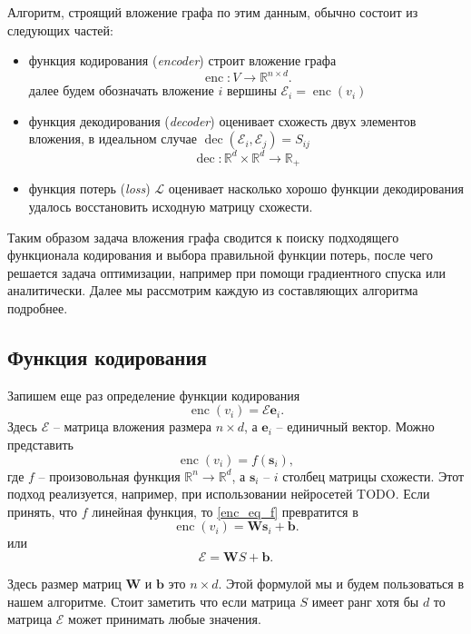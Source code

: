 \documentclass[12pt,a4paper]{extarticle}
\newcommand{\R}{\mathbb{R}}
\newcommand{\E}{\mathcal{E}}
\newcommand{\W}{\textbf{W}}
\newcommand{\s}{\textbf{s}}
\newcommand{\Loss}{\mathcal{L}}
\newcommand{\encoder}{\operatorname{enc}}
\newcommand{\decoder}{\operatorname{dec}}
\newcommand{\unit}[1]{\textbf{e}_{#1}}
\begin{document}
    Алгоритм, строящий вложение графа по этим данным, обычно состоит из следующих частей:
    \begin{itemize}
        \item функция кодирования (\textit{encoder}) строит вложение графа
            \[\encoder: V \to \R^{n \times d}.\]
            далее будем обозначать вложение $i$ вершины $\E_i = \encoder(v_i)$
        \item функция декодирования (\textit{decoder}) оценивает схожесть двух элементов вложения,
            в идеальном случае $\decoder(\E_i, \E_j) = S_{ij}$
            \[\decoder: \R^{d} \times \R^{d} \to \R_+\]
        \item функция потерь (\textit{loss}) $\Loss$ оценивает насколько хорошо функции декодирования удалось восстановить исходную матрицу схожести.
    \end{itemize}
    
    Таким образом задача вложения графа сводится к поиску подходящего функционала кодирования и выбора правильной функции потерь, после чего решается задача оптимизации, например при помощи градиентного спуска или аналитически. Далее мы рассмотрим каждую из составляющих алгоритма подробнее.

    \subsection{Функция кодирования}
    Запишем еще раз определение функции кодирования
    \begin{equation}
        \encoder(v_i) = \E\unit{i}.
    \end{equation}
    Здесь $\E$ -- матрица вложения размера $n \times d$, а $\unit{i}$ -- единичный вектор. Можно представить
    \begin{equation} \label{enc_eq_f}
        \encoder(v_i) = f(\s_i),
    \end{equation}
    где $f$ -- произовольная функция $\R^n \to \R^d$, а $\s_i$ -- $i$ столбец матрицы схожести. Этот подход реализуется, например, при использовании нейросетей TODO.
    Если принять, что $f$ линейная функция, то \eqref{enc_eq_f} превратится в
    \begin{equation}
        \encoder(v_i) = \W\s_i + \textbf{b}.
    \end{equation}
    или
    \begin{equation}
        \E = \W S + \textbf{b}.
    \end{equation}
    
    Здесь размер матриц $\W$ и $\textbf{b}$ это $n \times d$. Этой формулой мы и будем пользоваться в нашем алгоритме.
    Стоит заметить что если матрица $S$ имеет ранг хотя бы $d$ то матрица $\E$ может принимать любые значения.
\end{document}
